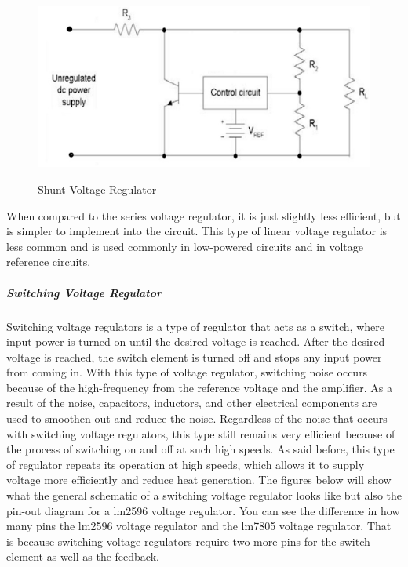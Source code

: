 \begin{figure}[H]
    \caption{Shunt Voltage Regulator}
    \centering
    \includegraphics[width=\textwidth]{images/Shunt_Voltage_Regulator.png}
    \label{fig:shunt-voltage-regulator}
\end{figure}
When compared to the series voltage regulator, it is just slightly less efficient, but is simpler to implement into the circuit. This type of linear voltage regulator is less common and is used commonly in low-powered circuits and in voltage reference circuits.\par
\subparagraph{Switching Voltage Regulator}
Switching voltage regulators is a type of regulator that acts as a switch, where input power is turned on until the desired voltage is reached. After the desired voltage is reached, the switch element is turned off and stops any input power from coming in. With this type of voltage regulator, switching noise occurs because of the high-frequency from the reference voltage and the amplifier. As a result of the noise, capacitors, inductors, and other electrical components are used to smoothen out and reduce the noise. Regardless of the noise that occurs with switching voltage regulators, this type still remains very efficient because of the process of switching on and off at such high speeds. As said before, this type of regulator repeats its operation at high speeds, which allows it to supply voltage more efficiently and reduce heat generation. The figures below will show what the general schematic of a switching voltage regulator looks like but also the pin-out diagram for a lm2596 voltage regulator. You can see the difference in how many pins the lm2596 voltage regulator and the lm7805 voltage regulator. That is because switching voltage regulators require two more pins for the switch element as well as the feedback.\par
